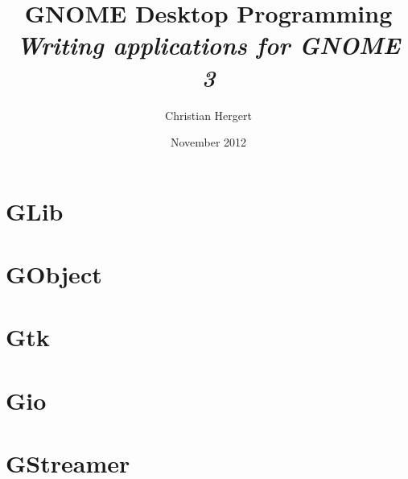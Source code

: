 

\title{
    GNOME Desktop Programming \\
    \textit{Writing applications for GNOME 3}
}
\author{Christian Hergert}
\date{November 2012}

\frontmatter
\maketitle
\tableofcontents


\mainmatter
\part{GLib}
\part{GObject}
\part{Gtk}
\part{Gio}
\part{GStreamer}
\appendix

